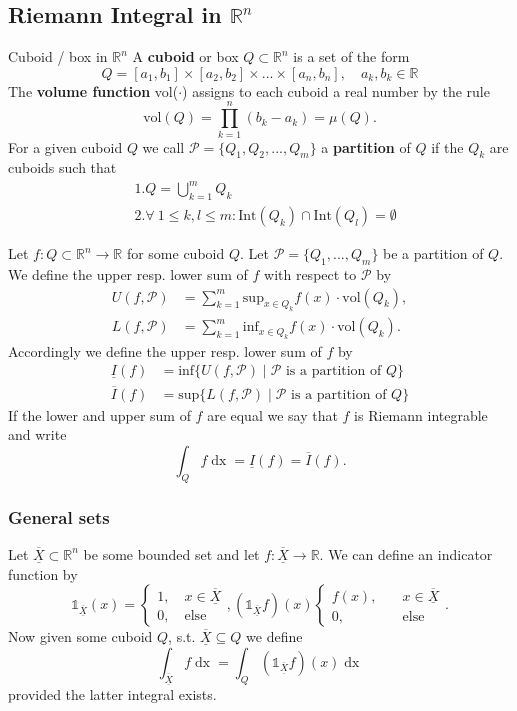 \documentclass[a4paper,fontsize = 8pt]{scrartcl}
\def\R{\mathbb{R}}
\def\X{\underline{\overline{X}}}
\def\P{\mathcal{P}}
\begin{document}
\subsection{Riemann Integral in \texorpdfstring{\(\R^n\)}{Rⁿ}}
\begin{subbox}{Cuboid / box in $\R^n$}
    A \textbf{cuboid} or box $Q \subset \R^n$ is a set of the form
    $$Q = [a_1, b_1] \times [a_2,b_2] \times ... \times [a_n,b_n], \quad a_k, b_k \in \R$$
    The \textbf{volume function} vol($\cdot$) assigns to each cuboid a real number by the rule 
    $$\text{vol}(Q) = \prod_{k = 1}^{n}(b_k - a_k) = \mu(Q).$$
    For a given cuboid $Q$ we call $\P = \{Q_1, Q_2, ..., Q_m\}$ a \textbf{partition} of $Q$ if the $Q_k$ are cuboids such that
    \begin{align*}
        &1. Q = \bigcup_{k = 1}^{m} Q_k\\
        &2. \forall \ 1 \leq k,l \leq m: \text{Int}(Q_k) \cap \text{Int}(Q_l) = \emptyset
    \end{align*}
\end{subbox}
Let $f: Q \subset \R^n \to \R$ for some cuboid $Q$. Let $\P = \{Q_1, ...,Q_m\}$ be a partition of $Q$. We define the upper resp. lower sum of $f$ with respect to $\P$ by 
\begin{align*}
    U(f, \P) &= \sum_{k = 1}^{m} \text{sup}_{x \in Q_k} f(x) \cdot \text{vol}(Q_k),\\
    L(f, \P) &= \sum_{k = 1}^{m} \text{inf}_{x \in Q_k} f(x) \cdot \text{vol}(Q_k).
\end{align*}
Accordingly we define the upper resp. lower sum of $f$ by 
\begin{align*}
    \underline{I}(f) &= \text{inf}\{U(f, \P) \mid \P \text{ is a partition of } Q\}\\
    \overline{I}(f) &= \text{sup}\{L(f, \P) \mid \P \text{ is a partition of } Q\}
\end{align*}
If the lower and upper sum of $f$ are equal we say that $f$ is Riemann integrable and write
$$\int_Q f \mathop{dx} = \underline{I}(f) = \overline{I}(f).$$

\subsubsection{General sets}
Let $\X \subset \R^n$ be some bounded set and let $f: \X \to \R$. We can define an indicator function by
\[\mathds{1}_{\X}(x) = 
\begin{cases}
    1, \quad x \in \X\\
    0, \quad \text{else}
\end{cases}, 
(\mathds{1}_{\X} f)(x) 
\begin{cases}
    f(x), \quad& x \in \X\\
    0, \quad& \text{else} 
\end{cases}.\]
Now given some cuboid $Q$, s.t. $\X \subseteq Q$ we define 
\[\int_{\X}f \mathop{dx} = \int_{Q}(\mathds{1}_{\X}f)(x)\mathop{dx}\]
provided the latter integral exists. 
\end{document}
